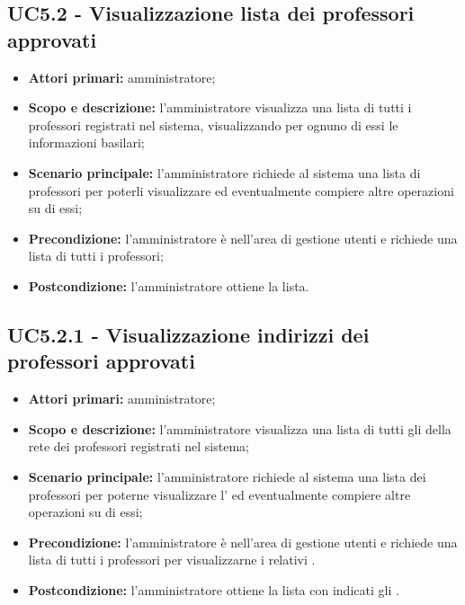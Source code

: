 \documentclass[AnalisiDeiRequisiti.tex]{subfiles}
\begin{document}
\subsection{UC5.2 - Visualizzazione lista dei professori approvati}
\begin{itemize}
	\item \textbf{Attori primari:} amministratore;
	\item \textbf{Scopo e descrizione:} l'amministratore visualizza una lista di tutti i professori registrati nel sistema, visualizzando per ognuno di essi le informazioni basilari;
	\item \textbf{Scenario principale:} l'amministratore richiede al sistema una lista di professori per poterli visualizzare ed eventualmente compiere altre operazioni su di essi;
	\item \textbf{Precondizione:} l'amministratore è nell'area di gestione utenti e richiede una lista di tutti i professori; 
	\item \textbf{Postcondizione:} l'amministratore ottiene la lista.
\end{itemize}
\subsection{UC5.2.1 - Visualizzazione indirizzi dei professori approvati}
\begin{itemize}
	\item \textbf{Attori primari:} amministratore;
	\item \textbf{Scopo e descrizione:} l'amministratore visualizza una lista di tutti gli  della rete  dei professori registrati nel sistema;
	\item \textbf{Scenario principale:} l'amministratore richiede al sistema una lista dei professori per poterne visualizzare l' ed eventualmente compiere altre operazioni su di essi;
	\item \textbf{Precondizione:} l'amministratore è nell'area di gestione utenti e richiede una lista di tutti i professori per visualizzarne i relativi .
	\item \textbf{Postcondizione:} l'amministratore ottiene la lista con indicati gli .
\end{itemize}
\end{document}
